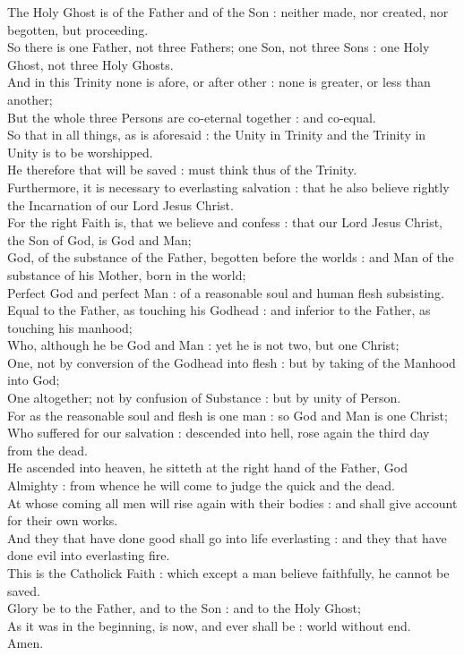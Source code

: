 The Holy Ghost is of the Father and of the Son : neither made, nor created, nor begotten, but proceeding.\\
So there is one Father, not three Fathers; one Son, not three Sons : one Holy Ghost, not three Holy Ghosts.\\
And in this Trinity none is afore, or after other : none is greater, or less than another;\\
But the whole three Persons are co-eternal together : and co-equal.\\
So that in all things, as is aforesaid : the Unity in Trinity and the Trinity in Unity is to be worshipped.\\
He therefore that will be saved : must think thus of the Trinity.\\
Furthermore, it is necessary to everlasting salvation : that he also believe rightly the Incarnation of our Lord Jesus Christ.\\
For the right Faith is, that we believe and confess : that our Lord Jesus Christ, the Son of God, is God and Man;\\
God, of the substance of the Father, begotten before the worlds : and Man of the substance of his Mother, born in the world;\\
Perfect God and perfect Man : of a reasonable soul and human flesh subsisting.\\
Equal to the Father, as touching his Godhead : and inferior to the Father, as touching his manhood;\\
Who, although he be God and Man : yet he is not two, but one Christ;\\
One, not by conversion of the Godhead into flesh : but by taking of the Manhood into God;\\
One altogether; not by confusion of Substance : but by unity of Person.\\
For as the reasonable soul and flesh is one man : so God and Man is one Christ;\\
Who suffered for our salvation : descended into hell, rose again the third day from the dead.\\
He ascended into heaven, he sitteth at the right hand of the Father, God Almighty : from whence he will come to judge the quick and the dead.\\
At whose coming all men will rise again with their bodies : and shall give account for their own works.\\
And they that have done good shall go into life everlasting : and they that have done evil into everlasting fire.\\
This is the Catholick Faith : which except a man believe faithfully, he cannot be saved.\\

Glory be to the Father, and to the Son : and to the Holy Ghost;\\
As it was in the beginning, is now, and ever shall be : world without end.\\
Amen.
